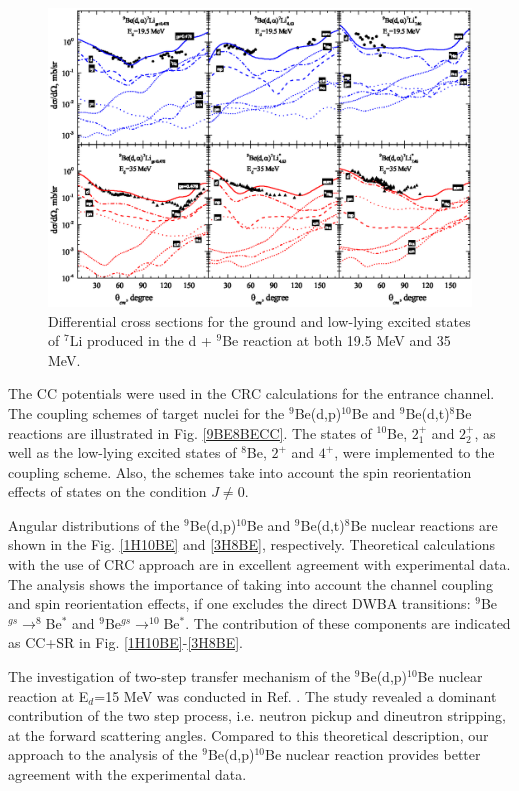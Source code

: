 \documentclass[10pt]{iopart}
\begin{document}
\begin{figure}[bp]
\centering
\includegraphics[scale=0.9]{4HE7LI.eps}
\caption{\label{label} Differential cross sections for the ground and low-lying excited states of $^{7}$Li  produced in the d + $^9$Be reaction at  both 19.5 MeV and 35 MeV. }
\label{4HE7LI}
\end{figure}	 

The CC potentials were used in the CRC calculations for the entrance channel. The coupling schemes of target nuclei for the $^9$Be(d,p)$^{10}$Be and $^9$Be(d,t)$^8$Be  reactions  are illustrated in Fig. \ref{9BE8BECC}. The states of $^{10}$Be,   $2^+_{1}$ and $2^+_{2}$, as well as the low-lying excited states of $^8$Be,  $2^+$ and $4^+$, were implemented to the coupling scheme. Also, the schemes take into account the spin reorientation effects of states on the condition $J\neq0$. 


Angular distributions of the $^9$Be(d,p)$^{10}$Be and  $^9$Be(d,t)$^{8}$Be nuclear reactions are shown in the Fig. \ref{1H10BE} and \ref{3H8BE}, respectively. Theoretical calculations with the use of CRC approach  are in excellent agreement with experimental data. The analysis shows  the importance of taking into account the channel coupling and spin reorientation effects, if one excludes the direct DWBA transitions: $^9$Be$^{gs}\rightarrow^8$Be$^*$ and $^9$Be$^{gs}\rightarrow^{10}$Be$^*$. The contribution of these components are indicated as CC+SR in Fig. \ref{1H10BE}-\ref{3H8BE}.


The investigation of two-step transfer mechanism of the $^9$Be(d,p)$^{10}$Be nuclear reaction at E$_d$=15 MeV was conducted in Ref. \cite{galanina2012}. The study revealed a dominant contribution of the two step process, i.e. neutron pickup and dineutron stripping, at the forward scattering angles. Compared to this theoretical description, our approach to the analysis of the $^9$Be(d,p)$^{10}$Be nuclear reaction provides better agreement with the experimental data. 
\end{document}
